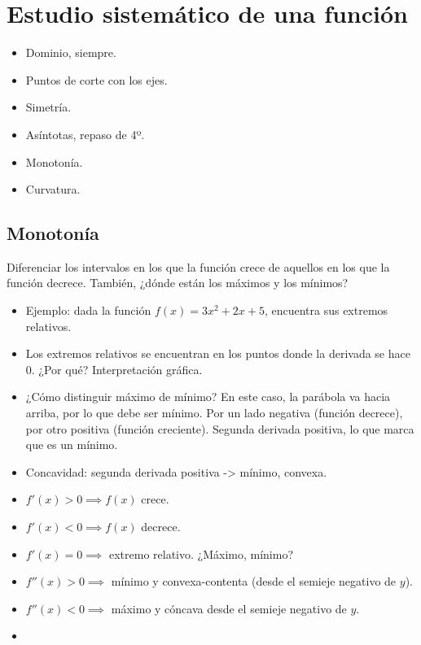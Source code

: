 \documentclass[palatino,nosec]{Docencia}
\begin{document}
\section{Estudio sistemático de una función}

\begin{itemize}
	\item Dominio, siempre.
	\item Puntos de corte con los ejes.
	\item Simetría.
	\item Asíntotas, repaso de 4º.
	\item Monotonía.
	\item Curvatura.
\end{itemize}

\subsection{Monotonía}

Diferenciar los intervalos en los que la función crece de aquellos en los que la función decrece. También, ¿dónde están los máximos y los mínimos?

\begin{itemize}
	\item Ejemplo: dada la función $f(x) = 3x^2+2x+5$, encuentra sus extremos relativos.
	\item Los extremos relativos se encuentran en los puntos donde la derivada se hace 0. ¿Por qué? Interpretación gráfica.
	\item ¿Cómo distinguir máximo de mínimo? En este caso, la parábola va hacia arriba, por lo que debe ser mínimo. 
	\subitem Por un lado negativa (función decrece), por otro positiva (función creciente).
	\subitem Segunda derivada positiva, lo que marca que es un mínimo.
	\item Concavidad: segunda derivada positiva -> mínimo, convexa.
\end{itemize}

\begin{itemize}
	\item $f'(x) > 0 \implies f(x)$ crece. 
	\item $f'(x) < 0 \implies f(x)$ decrece. 
	\item $f'(x) = 0 \implies $ extremo relativo. ¿Máximo, mínimo?
	\item $f''(x) > 0 \implies $ mínimo y convexa-contenta (desde el semieje negativo de $y$).
	\item $f''(x) < 0 \implies $ máximo y cóncava desde el semieje negativo de $y$.
	\item 
\end{itemize}
\end{document}
